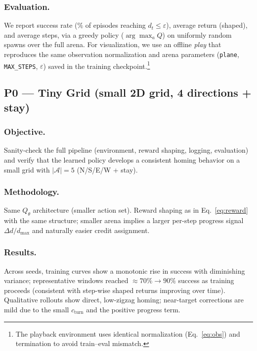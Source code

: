         \subsubsection{Evaluation.}
            We report success rate ($\%$ of episodes reaching $d_t\le\varepsilon$), average return (shaped), and average steps, via a greedy policy ($\arg\max_a Q$) on uniformly random spawns over the full arena. For visualization, we use an offline \emph{play} that reproduces the same observation normalization and arena parameters (\texttt{plane}, \texttt{MAX\_STEPS}, $\varepsilon$) saved in the training checkpoint.\footnote{The playback environment uses identical normalization (Eq.~\eqref{eq:obs}) and termination to avoid train–eval mismatch.}

    \subsection{P0 — Tiny Grid (small 2D grid, 4 directions + stay)}
        \subsubsection{Objective.}
            Sanity-check the full pipeline (environment, reward shaping, logging, evaluation) and verify that the learned policy develops a consistent homing behavior on a small grid with $|\mathcal{A}|=5$ (N/S/E/W + stay).

        \subsubsection{Methodology.}
            Same $Q_\theta$ architecture (smaller action set). Reward shaping as in Eq.~\eqref{eq:reward} with the same structure; smaller arena implies a larger per-step progress signal $\Delta d/d_{\max}$ and naturally easier credit assignment.

        \subsubsection{Results.}
            Across seeds, training curves show a monotonic rise in success with diminishing variance; representative windows reached $\approx 70\%\!\to\!90\%$ success as training proceeds (consistent with step-wise shaped returns improving over time). Qualitative rollouts show direct, low-zigzag homing; near-target corrections are mild due to the small $c_{\mathrm{turn}}$ and the positive progress term.

